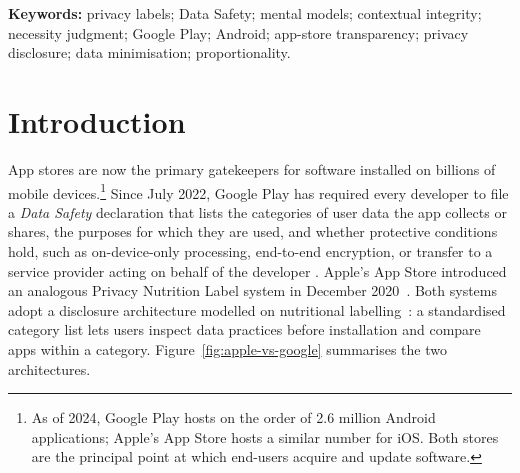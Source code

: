\documentclass[11pt,a4paper]{article}
\makeatletter
\let\@oldsection\section
\renewcommand{\section}{\FloatBarrier\@oldsection}
\makeatother
\begin{document}
\begin{abstract}
We use the term \emph{Necessity Gap} to describe the between-tier
pattern observed across category recognition, boundary acceptance, and
contextual necessity in our data. We do not claim the gap as a
confirmed within-person disconnect: with the present design, the
appropriate reading of RQ5 is that no association of practically
meaningful size was detected and an effect bounded by $\pm 0.45$
remains compatible with the evidence. From this exploratory base, and
from a category $\times$ purpose evidence-density map of the practices
participants encountered in the 310-app corpus, we propose five
\emph{untested design implications}, \emph{Why--Where--Who--Control--Flag}
(WWWCF), for the next generation of contextual app-store privacy
labels, and sketch a worked label redesign as an illustration. We also
propose the same five-question structure as a candidate
\emph{accurate} $\times$ \emph{actionable} rubric, on the explicit
understanding that no rubric instantiation, pilot, or inter-coder
reliability is reported in this paper; rubric validation is left to
follow-up work.
\end{abstract}

\noindent\textbf{Keywords:} privacy labels; Data Safety; mental models;
contextual integrity; necessity judgment; Google Play; Android; app-store
transparency; privacy disclosure; data minimisation; proportionality.

\section{Introduction}
\label{sec:introduction}

App stores are now the primary gatekeepers for software installed on
billions of mobile devices.\footnote{As of 2024, Google Play hosts on the
order of 2.6 million Android applications; Apple's App Store hosts a
similar number for iOS. Both stores are the principal point at which
end-users acquire and update software.} Since July 2022, Google Play has
required every developer to file a \emph{Data Safety} declaration that
lists the categories of user data the app collects or shares, the
purposes for which they are used, and whether protective conditions hold,
such as on-device-only processing, end-to-end encryption, or transfer to
a service provider acting on behalf of the developer
\citep{koch:etal:2022,bhagavatula:etal:2023}. Apple's App Store
introduced an analogous Privacy Nutrition Label system in
December 2020~\citep{zhang:etal:2022,kollnig:etal:2022}. Both systems
adopt a disclosure architecture modelled on nutritional
labelling~\citep{kelley:etal:2009,kelley:etal:2010,kelley:etal:2013}: a
standardised category list lets users inspect data practices before
installation and compare apps within a category. Figure~\ref{fig:apple-vs-google}
summarises the two architectures.
\end{document}

